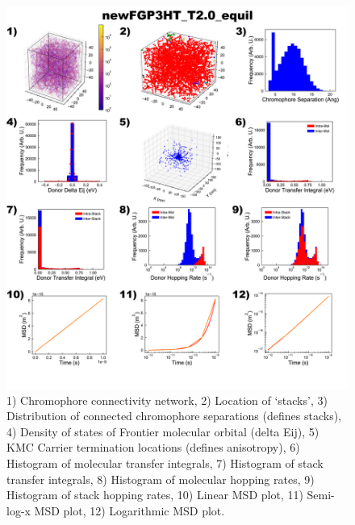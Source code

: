 \documentclass[12pt]{article}
\begin{document}
\begin{figure}[h]\centering
	\includegraphics[width=\textwidth]{Figures/newFGP3HT_T2.0_equil.png}
    \caption{   1) Chromophore connectivity network, 
                2) Location of `stacks', 
                3) Distribution of connected chromophore separations (defines stacks),
                4) Density of states of Frontier molecular orbital (delta Eij),
                5) KMC Carrier termination locations (defines anisotropy),
                6) Histogram of molecular transfer integrals,
                7) Histogram of stack transfer integrals,
                8) Histogram of molecular hopping rates,
                9) Histogram of stack hopping rates,
                10) Linear MSD plot,
                11) Semi-log-x MSD plot,
                12) Logarithmic MSD plot.}
	\label{fig:EqlT2.0}
\end{figure}
\end{document}
